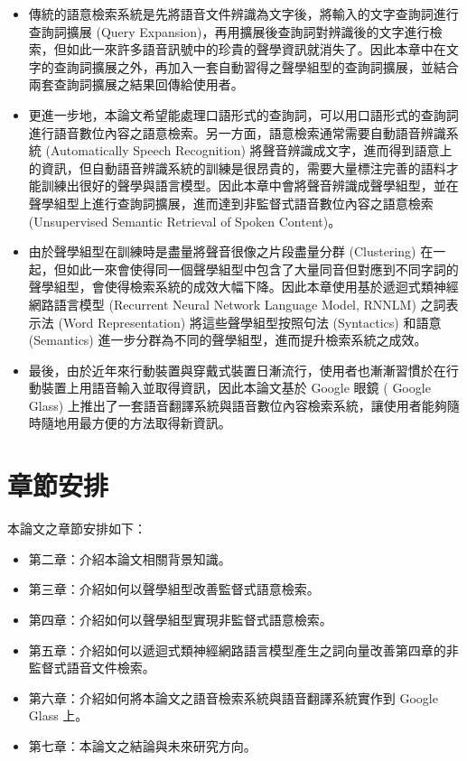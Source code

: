 \begin{itemize}
\itemsep -2pt %
  \item  傳統的語意檢索系統是先將語音文件辨識為文字後，將輸入的文字查詢詞進行查詢詞擴展 (Query Expansion)，再用擴展後查詢詞對辨識後的文字進行檢索，但如此一來許多語音訊號中的珍貴的聲學資訊就消失了。因此本章中在文字的查詢詞擴展之外，再加入一套自動習得之聲學組型的查詢詞擴展，並結合兩套查詢詞擴展之結果回傳給使用者。

  \item  更進一步地，本論文希望能處理口語形式的查詢詞，可以用口語形式的查詢詞進行語音數位內容之語意檢索。另一方面，語意檢索通常需要自動語音辨識系統 (Automatically Speech Recognition) 將聲音辨識成文字，進而得到語意上的資訊，但自動語音辨識系統的訓練是很昂貴的，需要大量標注完善的語料才能訓練出很好的聲學與語言模型。因此本章中會將聲音辨識成聲學組型，並在聲學組型上進行查詢詞擴展，進而達到非監督式語音數位內容之語意檢索 (Unsupervised Semantic Retrieval of Spoken Content)。
  
  \item  由於聲學組型在訓練時是盡量將聲音很像之片段盡量分群 (Clustering) 在一起，但如此一來會使得同一個聲學組型中包含了大量同音但對應到不同字詞的聲學組型，會使得檢索系統的成效大幅下降。因此本章使用基於遞迴式類神經網路語言模型 (Recurrent Neural Network Language Model, RNNLM) 之詞表示法 (Word Representation) 將這些聲學組型按照句法 (Syntactics) 和語意 (Semantics) 進一步分群為不同的聲學組型，進而提升檢索系統之成效。
   
  \item  最後，由於近年來行動裝置與穿戴式裝置日漸流行，使用者也漸漸習慣於在行動裝置上用語音輸入並取得資訊，因此本論文基於 Google 眼鏡 ( Google Glass) 上推出了一套語音翻譯系統與語音數位內容檢索系統，讓使用者能夠隨時隨地用最方便的方法取得新資訊。

\end{itemize}

\section{章節安排}
本論文之章節安排如下：

\begin{itemize}
\itemsep -2pt %
  \item  第二章：介紹本論文相關背景知識。
  \item  第三章：介紹如何以聲學組型改善監督式語意檢索。
  \item  第四章：介紹如何以聲學組型實現非監督式語意檢索。
  \item  第五章：介紹如何以遞迴式類神經網路語言模型產生之詞向量改善第四章的非監督式語音文件檢索。
  \item  第六章：介紹如何將本論文之語音檢索系統與語音翻譯系統實作到 Google Glass 上。
  \item  第七章：本論文之結論與未來研究方向。
\end{itemize}

